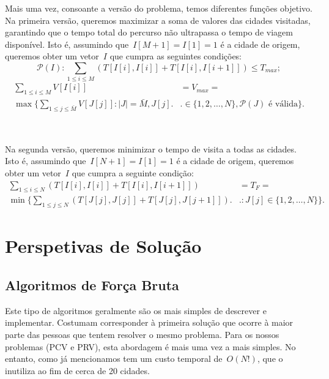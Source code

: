 \documentclass[12pt,a4paper,reqno]{report}
\numberwithin{figure}{section}
\numberwithin{equation}{section}
\begin{document}
Mais uma vez, consoante a versão do problema, temos diferentes funções objetivo. Na primeira versão, queremos maximizar a soma de valores das cidades visitadas, garantindo que o tempo total do percurso não ultrapassa o tempo de viagem disponível. Isto é, assumindo que~$I[M+1] = I[1] = 1$ é a cidade de origem, queremos obter um vetor~$I$ que cumpra as seguintes condições:
\begin{equation}
		\mathscr{P}(I): \sum_{1 \leq i \leq M} (T[I[i],I[i]] + T[I[i],I[i+1]]) \leq T_{max};
\end{equation}
\begin{equation}
	\begin{split}
		\sum_{1 \leq i \leq M} V[I[i]] & = V_{max} = \\
		\max \Bigg\{\sum_{1 \leq j \leq \bar{M}} V[J[j]] : |J| = \bar{M}, J[j] \Bigg. & \Bigg. \in \{1, 2, \ldots, N\}, \mathscr{P}(J) \text{ é válida}\Bigg\}.
	\end{split}
\end{equation}

\
\

Na segunda versão, queremos minimizar o tempo de visita a todas as cidades. Isto é, assumindo que~$I[N+1] = I[1] = 1$ é a cidade de origem, queremos obter um vetor~$I$ que cumpra a seguinte condição:
\begin{equation}
	\begin{split}
		\sum_{1 \leq i \leq N} (T[I[i],I[i]] + T[I[i],I[i+1]]) & = T_F = \\
		\min \Bigg\{\sum_{1 \leq j \leq N} (T[J[j],J[j]] + T[J[j],J[j+1]]) \Bigg. & \Bigg. : J[j] \in \{1, 2, \ldots, N\}\Bigg\}.
	\end{split}
\end{equation}


\chapter{Perspetivas de Solução}

\section{Algoritmos de Força Bruta}

Este tipo de algoritmos geralmente são os mais simples de descrever e implementar. Costumam corresponder à primeira solução que ocorre à maior parte das pessoas que tentem resolver o mesmo problema. Para os nossos problemas (PCV e PRV), esta abordagem é mais uma vez a mais simples. No entanto, como já mencionamos tem um custo temporal de~$O(N!)$, que o inutiliza ao fim de cerca de 20 cidades.
\end{document}
